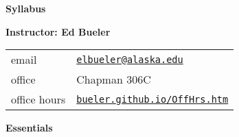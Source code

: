 \documentclass[12pt]{article}
\renewcommand{\emph}[1]{\textsf{\textbf{#1}}}
\newcommand{\localhead}[1]{\par\smallskip\textbf{#1}\nobreak\\}%
\def\heading#1{\localhead{\large\emph{#1}}}
\begin{document}
\phantom{foo}
\begin{center}
{\LARGE\sf \textbf{Syllabus}}
\end{center}
\cfoot{}

\heading{Instructor: Ed Bueler}

\quad \begin{tabularx}{\textwidth}{lX}
email        & \href{mailto:elbueler@alaska.edu}{\texttt{elbueler@alaska.edu}} \\
office       & Chapman 306C \\
office hours \phantom{jfxdsd} & \href{http://bueler.github.io/OffHrs.htm}{\tt bueler.github.io/OffHrs.htm}
\end{tabularx}

\bigskip

\heading{Essentials}
\end{document}
